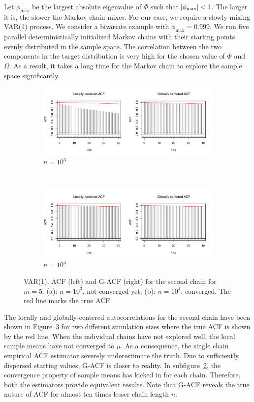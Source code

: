 \documentclass[11pt]{article}
\theoremstyle{remark}
\begin{document}
Let $\phi_{\max}$ be the largest absolute eigenvalue of $\Phi$ such that $\abs{\phi_{\max}} < 1$. The larger it is, the slower the Markov chain mixes. For our case, we require a slowly mixing VAR(1) process. We consider a bivariate example with $\phi_{\max} = 0.999$. We run five parallel deterministically initialized Markov chains with their starting points evenly distributed in the sample space. The correlation between the two components in the target distribution is very high for the chosen value of $\Phi$ and $\Omega$. As a result, it takes a long time for the Markov chain to explore the sample space significantly. \\

\begin{figure}[h]
 \begin{subfigure}[h]{\textwidth}
   \centering
   \includegraphics[width=.7\linewidth]{plots/var-acf_n1000.pdf}
   \caption{$n = 10^3$}
   \label{subfig:var-acf_n1e3}
\end{subfigure}\\
\begin{subfigure}[h]{\textwidth}
  \centering
  \includegraphics[width=.7\linewidth]{plots/var-acf_n10000.pdf} 
  \caption{$n = 10^4$}
  \label{subfig:var-acf_n1e4}
\end{subfigure}

\caption{VAR(1). ACF (left) and G-ACF (right) for the second chain for $m=5$. (a): $n = 10^3$, not converged yet; (b): $n =  10^4$, converged. The red line marks the true ACF.}
\label{fig:var-acf}
\end{figure}

The locally and globally-centered autocorrelations for the second chain have been shown in Figure~\ref{fig:var-acf} for two different simulation sizes where the true ACF is shown by the red line. When the individual chains have not explored well, the local sample means have not converged to $\mu$. As a consequence, the single chain empirical ACF estimator severely underestimate the truth. Due to sufficiently dispersed starting values, G-ACF is closer to reality. In subfigure~\ref{subfig:var-acf_n1e4}, the convergence property of sample means has kicked in for each chain. Therefore, both the estimators provide equivalent results. Note that G-ACF reveals the true nature of ACF for almost ten times lesser chain length $n$.\\
\end{document}
